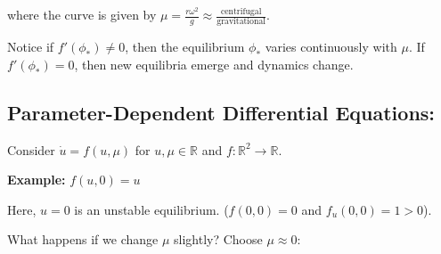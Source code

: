 \documentclass[12pt]{article}
\newcommand{\R}{\mathbb{R}}
\newcommand*{\tbf}[1]{\ifmmode\mathbf{#1}\else\textbf{#1}\fi}
\begin{document}
where the curve is given by $\mu = \frac{r\omega^2}{g} \approx \frac{\text{centrifugal}}{\text{gravitational}}$.

Notice if $f'(\phi_*) \neq 0$, then the equilibrium $\phi_*$ varies continuously with $\mu$. If $f'(\phi_*) =0$, then new equilibria emerge and dynamics change.

\subsection*{Parameter-Dependent Differential Equations:} Consider $\dot u = f(u, \mu)$ for $u, \mu \in \R$ and $f: \R^2 \to \R$.

\tbf{Example:} $f(u, 0) = u$
\begin{center}
\end{center}

Here, $u = 0$ is an unstable equilibrium. ($f(0, 0) =0$ and $f_u(0, 0) = 1 > 0$).

What happens if we change $\mu$ slightly? Choose $\mu \approx 0$:
\end{document}

